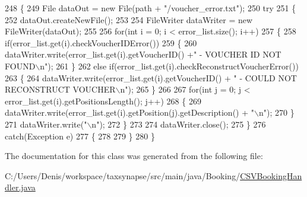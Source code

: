 \begin{DoxyCode}
248     \{
249         File dataOut = \textcolor{keyword}{new} File(path + \textcolor{stringliteral}{"/voucher\_error.txt"});
250         \textcolor{keywordflow}{try}
251         \{
252         dataOut.createNewFile();
253         
254         FileWriter dataWriter = \textcolor{keyword}{new} FileWriter(dataOut);
255         
256         \textcolor{keywordflow}{for}(\textcolor{keywordtype}{int} i = 0; i < error\_list.size(); i++)
257         \{
258             \textcolor{keywordflow}{if}(error\_list.get(i).checkVoucherIDError())
259             \{
260                 dataWriter.write(error\_list.get(i).getVoucherID() +\textcolor{stringliteral}{" - VOUCHER ID NOT FOUND\(\backslash\)n"});
261             \}
262             \textcolor{keywordflow}{else} \textcolor{keywordflow}{if}(error\_list.get(i).checkReconstructVoucherError())
263             \{
264                 dataWriter.write(error\_list.get(i).getVoucherID() + \textcolor{stringliteral}{" - COULD NOT RECONSTRUCT VOUCHER\(\backslash\)n"});
265             \}
266             
267             \textcolor{keywordflow}{for}(\textcolor{keywordtype}{int} j = 0; j < error\_list.get(i).getPositionsLength(); j++)
268             \{
269                 dataWriter.write(error\_list.get(i).getPosition(j).getDescription() + \textcolor{stringliteral}{"\(\backslash\)n"});
270             \}
271             dataWriter.write(\textcolor{stringliteral}{"\(\backslash\)n"});
272         \}
273         
274         dataWriter.close();
275         \}
276         \textcolor{keywordflow}{catch}(Exception e)
277         \{
278             
279         \}
280     \}
\end{DoxyCode}


The documentation for this class was generated from the following file\+:\begin{DoxyCompactItemize}
\item 
C\+:/\+Users/\+Denis/workspace/taxsynapse/src/main/java/\+Booking/\hyperlink{_c_s_v_booking_handler_8java}{C\+S\+V\+Booking\+Handler.\+java}\end{DoxyCompactItemize}
